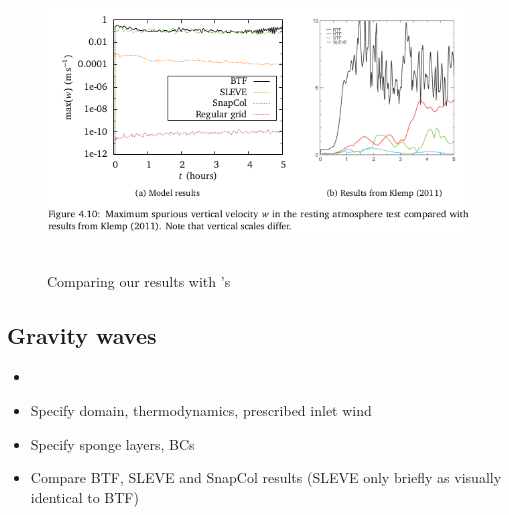 \documentclass[a4paper]{article}
\begin{document}
\begin{figure}
	\includegraphics[height=3in]{resting-atmosphere-w.png}
%
	\caption{Comparing our results with \textcite{klemp2011}'s}
	\label{fig:resting}
\end{figure}

\subsection{Gravity waves}
\begin{itemize}
	\item {}
	\item Specify domain, thermodynamics, prescribed inlet wind
	\item Specify sponge layers, BCs
	\item Compare BTF, SLEVE and SnapCol results (SLEVE only briefly as visually identical to BTF)
\end{itemize}
\end{document}
